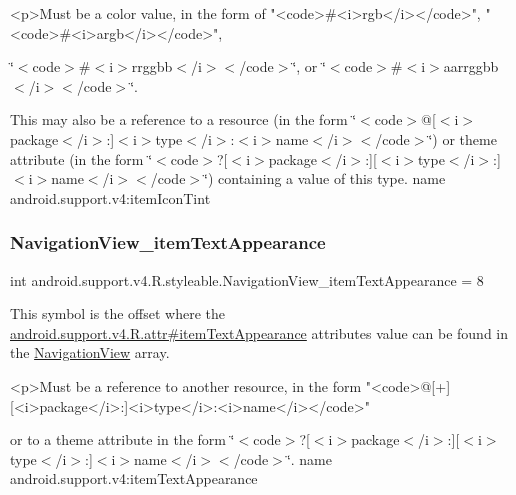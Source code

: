 \begin{DoxyVerb}      <p>Must be a color value, in the form of "<code>#<i>rgb</i></code>", "<code>#<i>argb</i></code>",
\end{DoxyVerb}
 \char`\"{}$<$code$>$\#$<$i$>$rrggbb$<$/i$>$$<$/code$>$\char`\"{}, or \char`\"{}$<$code$>$\#$<$i$>$aarrggbb$<$/i$>$$<$/code$>$\char`\"{}. 

This may also be a reference to a resource (in the form \char`\"{}$<$code$>$@\mbox{[}$<$i$>$package$<$/i$>$\+:\mbox{]}$<$i$>$type$<$/i$>$\+:$<$i$>$name$<$/i$>$$<$/code$>$\char`\"{}) or theme attribute (in the form \char`\"{}$<$code$>$?\mbox{[}$<$i$>$package$<$/i$>$\+:\mbox{]}\mbox{[}$<$i$>$type$<$/i$>$\+:\mbox{]}$<$i$>$name$<$/i$>$$<$/code$>$\char`\"{}) containing a value of this type.  name android.\+support.\+v4\+:item\+Icon\+Tint \mbox{\label{classandroid_1_1support_1_1v4_1_1R_1_1styleable_a349ff552ebf7326a68f420379297db8e}} 
\subsubsection{\texorpdfstring{Navigation\+View\+\_\+item\+Text\+Appearance}{NavigationView\_itemTextAppearance}}
{\footnotesize\ttfamily int android.\+support.\+v4.\+R.\+styleable.\+Navigation\+View\+\_\+item\+Text\+Appearance = 8\hspace{0.3cm}{\ttfamily [static]}}

This symbol is the offset where the \hyperlink{classandroid_1_1support_1_1v4_1_1R_1_1attr_a1ba476808cf74de21a386d8c81888cf9}{android.\+support.\+v4.\+R.\+attr\#item\+Text\+Appearance} attribute\textquotesingle{}s value can be found in the \hyperlink{classandroid_1_1support_1_1v4_1_1R_1_1styleable_a6e99b86cbaa0c61ca7598c15df537789}{Navigation\+View} array.

\begin{DoxyVerb}      <p>Must be a reference to another resource, in the form "<code>@[+][<i>package</i>:]<i>type</i>:<i>name</i></code>"
\end{DoxyVerb}
 or to a theme attribute in the form \char`\"{}$<$code$>$?\mbox{[}$<$i$>$package$<$/i$>$\+:\mbox{]}\mbox{[}$<$i$>$type$<$/i$>$\+:\mbox{]}$<$i$>$name$<$/i$>$$<$/code$>$\char`\"{}.  name android.\+support.\+v4\+:item\+Text\+Appearance \mbox{\label{classandroid_1_1support_1_1v4_1_1R_1_1styleable_a23b2727a764707c6a7ea9c2eabf7a8d7}} 
